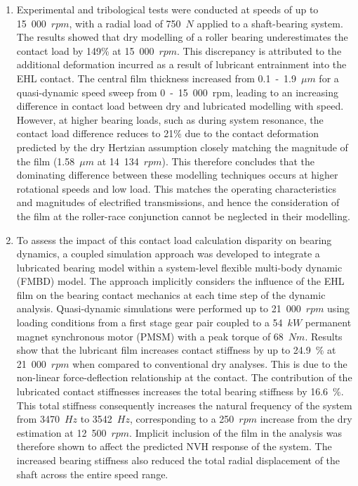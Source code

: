 \begin{enumerate}
	\item Experimental and tribological tests were conducted at speeds of up to 15~000~$rpm$, with a radial load of 750~$N$ applied to a shaft-bearing system. The results showed that dry modelling of a roller bearing underestimates the contact load by 149\% at 15~000~$rpm$. This discrepancy is attributed to the additional deformation incurred as a result of lubricant entrainment into the EHL contact. The central film thickness increased from 0.1~-~1.9~${\mu m}$ for a quasi-dynamic speed sweep from 0~-~15~000~rpm, leading to an increasing difference in contact load between dry and lubricated modelling with speed. However, at higher bearing loads, such as during system resonance, the contact load difference reduces to 21\% due to the contact deformation predicted by the dry Hertzian assumption closely matching the magnitude of the film (1.58~${\mu m}$ at 14~134~$rpm$). This therefore concludes that the dominating difference between these modelling techniques occurs at higher rotational speeds and low load. This matches the operating characteristics and magnitudes of electrified transmissions, and hence the consideration of the film at the roller-race conjunction cannot be neglected in their modelling.
		
	\item To assess the impact of this contact load calculation disparity on bearing dynamics, a coupled simulation approach was developed to integrate a lubricated bearing model within a system-level flexible multi-body dynamic (FMBD) model. The approach implicitly considers the influence of the EHL film on the bearing contact mechanics at each time step of the dynamic analysis. Quasi-dynamic simulations were performed up to 21~000~$rpm$ using loading conditions from a first stage gear pair coupled to a 54~$kW$ permanent magnet synchronous motor (PMSM) with a peak torque of 68~$Nm$. Results show that the lubricant film increases contact stiffness by up to 24.9~\% at 21~000~$rpm$ when compared to conventional dry analyses. This is due to the non-linear force-deflection relationship at the contact. 
	The contribution of the lubricated contact stiffnesses increases the total bearing stiffness by 16.6~\%. This total stiffness consequently increases the natural frequency of the system from 3470~$Hz$ to 3542~$Hz$, corresponding to a 250~$rpm$ increase from the dry estimation at 12~500~$rpm$. Implicit inclusion of the film in the analysis was therefore shown to affect the predicted NVH response of the system. The increased bearing stiffness also reduced the total radial displacement of the shaft across the entire speed range.
	

\end{enumerate}
